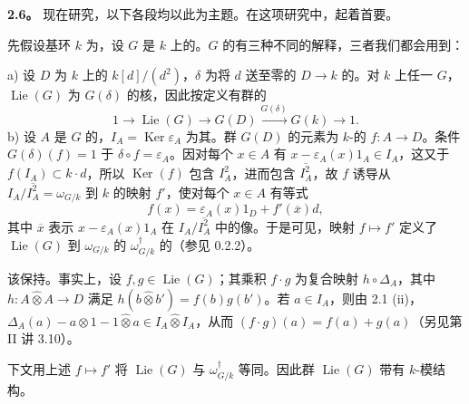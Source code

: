 \textbf{2.6。} 现在研究，以下各段均以此为主题。在这项研究中，起着首要。

先假设基环 $k$ 为，设 $G$ 是 $k$ 上的。$G$ 的有三种不同的解释，三者我们都会用到：

a) 设 $D$ 为 $k$ 上的 $k[d]/(d^2)$，$\delta$ 为将 $d$ 送至零的 $D\to k$ 的。对 $k$ 上任一 $G$，$\operatorname{Lie}(G)$ 为 $G(\delta)$ 的核，因此按定义有群的
\[
1\longrightarrow\operatorname{Lie}(G)\longrightarrow G(D)\xrightarrow{G(\delta)}G(k)\longrightarrow1.
\]
b) 设 $A$ 是 $G$ 的，$I_A=\operatorname{Ker}\varepsilon_A$ 为其。群 $G(D)$ 的元素为 $k$-的 $f:A\to D$。条件 $G(\delta)(f)=1$ 于 $\delta\circ f=\varepsilon_A$。因对每个 $x\in A$ 有 $x-\varepsilon_A(x)1_A\in I_A$，这又于 $f(I_A)\subset k\cdot d$，所以 $\operatorname{Ker}(f)$ 包含 $I_A^2$，进而包含 $\overline{I_A^2}$，故 $f$ 诱导从 $I_A/\overline{I_A^2}=\omega_{G/k}$ 到 $k$ 的映射 $f'$，使对每个 $x\in A$ 有等式
\[
f(x)=\varepsilon_A(x)1_D+f'(\overline x)d,
\]
其中 $\overline x$ 表示 $x-\varepsilon_A(x)1_A$ 在 $I_A/\overline{I_A^2}$ 中的像。于是可见，映射 $f\mapsto f'$ 定义了 $\operatorname{Lie}(G)$ 到 $\omega_{G/k}$ 的 $\omega_{G/k}^\dagger$ 的（参见 0.2.2）。

该保持。事实上，设 $f,g\in\operatorname{Lie}(G)$；其乘积 $f\cdot g$ 为复合映射 $h\circ\Delta_A$，其中 $h:A\widehat\otimes A\to D$ 满足 $h(b\widehat\otimes b')=f(b)g(b')$。若 $a\in I_A$，则由 2.1 (ii)，$\Delta_A(a)-a\widehat\otimes1-1\widehat\otimes a\in I_A\widehat\otimes I_A$，从而 $(f\cdot g)(a)=f(a)+g(a)$（另见第 II 讲 3.10）。

下文用上述 $f\mapsto f'$ 将 $\operatorname{Lie}(G)$ 与 $\omega_{G/k}^\dagger$ 等同。因此群 $\operatorname{Lie}(G)$ 带有 $k$-模结构。

